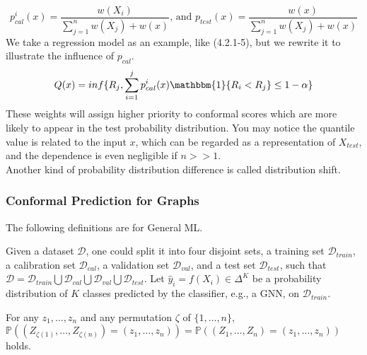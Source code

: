 \begin{equation}
p_{cal}^i(x)=\frac{w(X_i)}{\sum_{j=1}^n w(X_j)+w(x)}\text{, and } p_{test}(x)=\frac{w(x)}{\sum_{j=1}^n w(X_j)+w(x)}
\end{equation}
We take a regression model as an example, like (4.2.1-5), but we rewrite it to illustrate the influence of $p_{cal}$.
\begin{equation}
Q(x) = inf\{R_j,\sum_{i=1}^j p_{cal}^i(x)\mathbbm{1}\{R_i<R_j\}\leq 1-\alpha \}
\end{equation}
These weights will assign higher priority to conformal scores which are more likely to appear in the test probability distribution.  You may notice the quantile value is related to the input $x$, which can be regarded as a representation of $X_{test}$, and the dependence is even negligible if $n>>1$. \\

\noindent Another kind of probability distribution difference is called distribution shift.  
\subsubsection{Conformal Prediction for Graphs}
The following definitions are for General ML.

Given a dataset $\mathcal{D}$, one could split it into four disjoint sets, a training set $\mathcal{D}_{train}$, a calibration set $\mathcal{D}_{cal}$, a validation set $\mathcal{D}_{val}$, and a test set $\mathcal{D}_{test}$, such that $\mathcal{D} = \mathcal{D}_{train} \bigcup \mathcal{D}_{cal} \bigcup \mathcal{D}_{val} \bigcup \mathcal{D}_{test}$.
Let $\hat{y}_i= f(X_i) \in \Delta^K$ be a probability distribution of $K$ classes predicted by the classifier, e.g., a GNN, on $\mathcal{D}_{train}$.
% 

\begin{definition}[Exchangeability]
\label{def:exchangeability}
    For any $z_1, \dots, z_n$ and any permutation $\zeta$ of $\{1, \dots, n\}$, 
    $\mathbb{P} \left( (Z_{\zeta(1)}, \dots, Z_{\zeta(n)}) = (z_1, \dots, z_n) \right) = 
    \mathbb{P} \left( (Z_1, \dots, Z_n) = (z_1, \dots, z_n) \right)$ holds. 
\end{definition}

